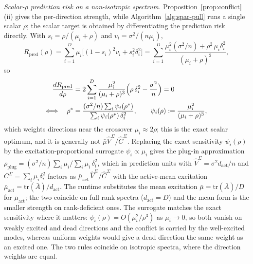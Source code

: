 \medskip
\noindent\emph{Scalar-$\rho$ prediction risk on a non-isotropic spectrum.}
Proposition~\ref{prop:conflict}(ii) gives the per-direction strength, while Algorithm~\ref{alg:spar-pull} runs a single scalar $\rho$; the scalar target is obtained by differentiating the prediction risk directly.
With $s_i = \rho/(\mu_i+\rho)$ and $v_i = \sigma^2/(n\mu_i)$,
\[
  R_{\mathrm{pred}}(\rho)
  = \sum_{i=1}^D \mu_i\bigl[(1-s_i)^2 v_i + s_i^2\delta_i^2\bigr]
  = \sum_{i=1}^D \frac{\mu_i^2(\sigma^2/n) + \rho^2\,\mu_i\delta_i^2}{(\mu_i+\rho)^2},
\]
so
\[
\begin{aligned}
  \frac{d R_{\mathrm{pred}}}{d\rho}
  &= 2\sum_{i=1}^D \frac{\mu_i^2}{(\mu_i+\rho)^3}
    \Bigl(\rho\,\delta_i^2 - \frac{\sigma^2}{n}\Bigr) = 0 \\
  \Longleftrightarrow\quad
  \rho^* &= \frac{(\sigma^2/n)\sum_i \psi_i(\rho^*)}{\sum_i \psi_i(\rho^*)\,\delta_i^2},
  \qquad
  \psi_i(\rho) := \frac{\mu_i^2}{(\mu_i+\rho)^3},
\end{aligned}
\]
which weights directions near the crossover $\mu_i \approx 2\rho$; this is the exact scalar optimum, and it is generally not $\bar\mu\widehat V^\Sigma/\widehat C^\Sigma$.
Replacing the exact sensitivity $\psi_i(\rho)$ by the excitation-proportional surrogate $\psi_i \propto \mu_i$ gives the plug-in approximation
$\rho_{\mathrm{plug}} = (\sigma^2/n)\sum_i \mu_i \big/ \sum_i \mu_i\,\delta_i^2$, which in prediction units with $\widehat V^\Sigma = \sigma^2 d_{\mathrm{act}}/n$ and $C^\Sigma = \sum_i \mu_i\delta_i^2$ factors as $\bar\mu_{\mathrm{act}}\,\widehat V^\Sigma/\widehat C^\Sigma$ with the active-mean excitation $\bar\mu_{\mathrm{act}} = \mathrm{tr}(\bar A)/d_{\mathrm{act}}$.
The runtime substitutes the mean excitation $\bar\mu = \mathrm{tr}(\bar A)/D$ for $\bar\mu_{\mathrm{act}}$; the two coincide on full-rank spectra ($d_{\mathrm{act}} = D$) and the mean form is the smaller strength on rank-deficient ones.
The surrogate matches the exact sensitivity where it matters: $\psi_i(\rho) = O(\mu_i^2/\rho^3)$ as $\mu_i \to 0$, so both vanish on weakly excited and dead directions and the conflict is carried by the well-excited modes, whereas uniform weights would give a dead direction the same weight as an excited one.
The two rules coincide on isotropic spectra, where the direction weights are equal.

